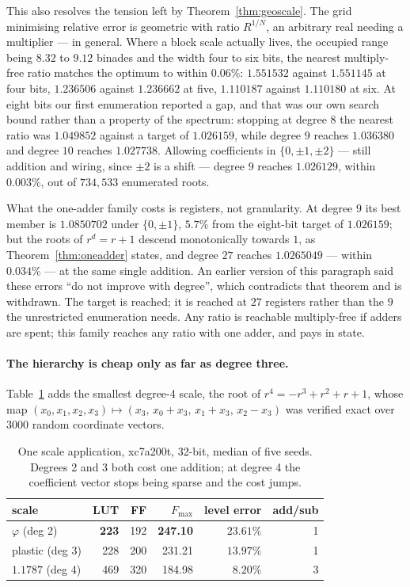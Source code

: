 \documentclass[11pt]{article}
\theoremstyle{definition}
\begin{document}
This also resolves the tension left by Theorem~\ref{thm:geoscale}. The grid
minimising relative error is geometric with ratio $R^{1/N}$, an arbitrary real
needing a multiplier --- in general. Where a block scale actually lives, the
occupied range being $8.32$ to $9.12$ binades and the width four to six bits,
the nearest multiply-free ratio matches the optimum to within $0.06\%$:
$1.551532$ against $1.551145$ at four bits, $1.236506$ against $1.236662$ at
five, $1.110187$ against $1.110180$ at six. At eight bits our first enumeration reported a gap, and that was our own search
bound rather than a property of the spectrum: stopping at degree $8$ the nearest
ratio was $1.049852$ against a target of $1.026159$, while degree $9$ reaches
$1.036380$ and degree $10$ reaches $1.027738$. Allowing coefficients in
$\{0,\pm1,\pm2\}$ --- still addition and wiring, since $\pm2$ is a shift ---
degree $9$ reaches $1.026129$, within $0.003\%$, out of $734{,}533$ enumerated
roots.

What the one-adder family costs is registers, not granularity. At degree $9$ its
best member is $1.0850702$ under $\{0,\pm1\}$, $5.7\%$ from the eight-bit target
of $1.026159$; but the roots of $r^d=r+1$ descend monotonically towards $1$, as
Theorem~\ref{thm:oneadder} states, and degree $27$ reaches $1.0265049$ ---
within $0.034\%$ --- at the same single addition. An earlier version of this
paragraph said these errors ``do not improve with degree'', which contradicts
that theorem and is withdrawn. The target is reached; it is reached at $27$
registers rather than the $9$ the unrestricted enumeration needs. Any ratio is
reachable multiply-free if adders are spent; this family reaches any ratio with
one adder, and pays in state.

\paragraph{The hierarchy is cheap only as far as degree three.}
Table~\ref{tab:deg4} adds the smallest degree-4 scale, the root of
$r^4=-r^3+r^2+r+1$, whose map $(x_0,x_1,x_2,x_3)\mapsto(x_3,\,x_0{+}x_3,\,
x_1{+}x_3,\,x_2{-}x_3)$ was verified exact over $3000$ random coordinate
vectors.

\begin{table}[t]\centering
\caption{One scale application, xc7a200t, 32-bit, median of five seeds. Degrees
2 and 3 both cost one addition; at degree 4 the coefficient vector stops being
sparse and the cost jumps.}
\label{tab:deg4}
\begin{tabular}{lrrrrr}
\toprule
scale & LUT & FF & $F_{\max}$ & level error & add/sub \\
\midrule
$\varphi$ (deg 2)      & \textbf{223} & 192 & \textbf{247.10} & $23.61\%$ & 1 \\
plastic (deg 3)        & 228 & 200 & 231.21 & $13.97\%$ & 1 \\
$1.1787$ (deg 4)       & 469 & 320 & 184.98 & $\mathbf{8.20\%}$ & 3 \\
\bottomrule
\end{tabular}
\end{table}
\end{document}
